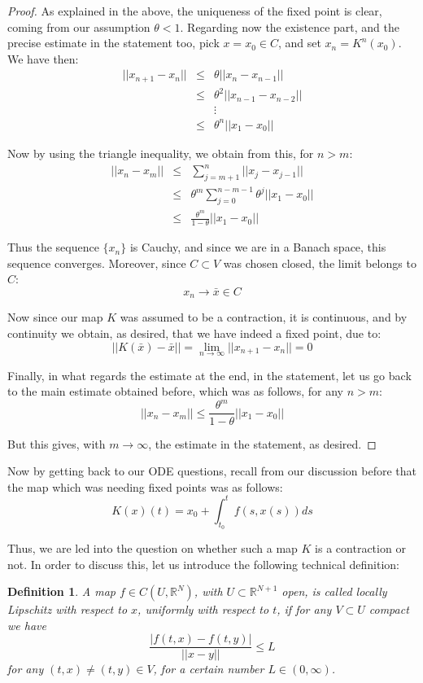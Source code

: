 \documentclass[12pt]{amsbook}
\newtheorem{definition}[theorem]{Definition}
\begin{document}
\begin{proof}
As explained in the above, the uniqueness of the fixed point is clear, coming from our assumption $\theta<1$. Regarding now the existence part, and the precise estimate in the statement too, pick $x=x_0\in C$, and set $x_n=K^n(x_0)$. We have then:
\begin{eqnarray*}
||x_{n+1}-x_n||
&\leq&\theta||x_n-x_{n-1}||\\
&\leq&\theta^2||x_{n-1}-x_{n-2}||\\
&&\vdots\\
&\leq&\theta^n||x_1-x_0||
\end{eqnarray*}

Now by using the triangle inequality, we obtain from this, for $n>m$:
\begin{eqnarray*}
||x_n-x_m||
&\leq&\sum_{j=m+1}^n||x_j-x_{j-1}||\\
&\leq&\theta^m\sum_{j=0}^{n-m-1}\theta^j||x_1-x_0||\\
&\leq&\frac{\theta^m}{1-\theta}||x_1-x_0||
\end{eqnarray*}

Thus the sequence $\{x_n\}$ is Cauchy, and since we are in a Banach space, this sequence converges. Moreover, since $C\subset V$ was chosen closed, the limit belongs to $C$:
$$x_n\to\bar{x}\in C$$

Now since our map $K$ was assumed to be a contraction, it is continuous, and by continuity we obtain, as desired, that we have indeed a fixed point, due to:
$$||K(\bar{x})-\bar{x}||=\lim_{n\to\infty}||x_{n+1}-x_n||=0$$

Finally, in what regards the estimate at the end, in the statement, let us go back to the main estimate obtained before, which was as follows, for any $n>m$:
$$||x_n-x_m||\leq\frac{\theta^m}{1-\theta}||x_1-x_0||$$ 

But this gives, with $m\to\infty$, the estimate in the statement, as desired.
\end{proof}

Now by getting back to our ODE questions, recall from our discussion before that the map which was needing fixed points was as follows:
$$K(x)(t)=x_0+\int_{t_0}^tf(s,x(s))ds$$

Thus, we are led into the question on whether such a map $K$ is a contraction or not. In order to discuss this, let us introduce the following technical definition:

\begin{definition}
A map $f\in C(U,\mathbb R^N)$, with $U\subset\mathbb R^{N+1}$ open, is called locally Lipschitz with respect to $x$, uniformly with respect to $t$, if for any $V\subset U$ compact we have
$$\frac{|f(t,x)-f(t,y)|}{||x-y||}\leq L$$
for any $(t,x)\neq(t,y)\in V$, for a certain number $L\in(0,\infty)$.
\end{definition}
\end{document}

